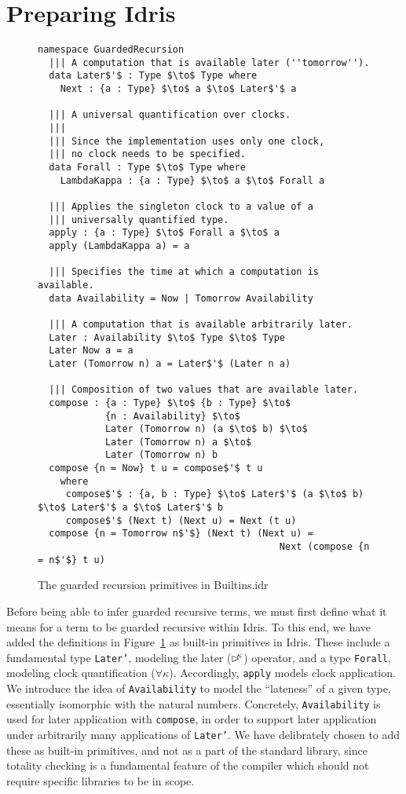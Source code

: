 \section{Preparing Idris}
\begin{figure}[h]
\begin{lstlisting}[mathescape,title=\idrisBlock]
namespace GuardedRecursion
  ||| A computation that is available later (''tomorrow'').
  data Later$'$ : Type $\to$ Type where
    Next : {a : Type} $\to$ a $\to$ Later$'$ a

  ||| A universal quantification over clocks.
  |||
  ||| Since the implementation uses only one clock,
  ||| no clock needs to be specified.
  data Forall : Type $\to$ Type where
    LambdaKappa : {a : Type} $\to$ a $\to$ Forall a
 
  ||| Applies the singleton clock to a value of a
  ||| universally quantified type.
  apply : {a : Type} $\to$ Forall a $\to$ a
  apply (LambdaKappa a) = a 

  ||| Specifies the time at which a computation is available.
  data Availability = Now | Tomorrow Availability

  ||| A computation that is available arbitrarily later.
  Later : Availability $\to$ Type $\to$ Type
  Later Now a = a
  Later (Tomorrow n) a = Later$'$ (Later n a)
  
  ||| Composition of two values that are available later.                             
  compose : {a : Type} $\to$ {b : Type} $\to$ 
            {n : Availability} $\to$ 
            Later (Tomorrow n) (a $\to$ b) $\to$ 
            Later (Tomorrow n) a $\to$ 
            Later (Tomorrow n) b
  compose {n = Now} t u = compose$'$ t u
    where
     compose$'$ : {a, b : Type} $\to$ Later$'$ (a $\to$ b) $\to$ Later$'$ a $\to$ Later$'$ b
     compose$'$ (Next t) (Next u) = Next (t u)
  compose {n = Tomorrow n$'$} (Next t) (Next u) = 
                                           Next (compose {n = n$'$} t u)
\end{lstlisting}
  \caption{The guarded recursion primitives in Builtins.idr}
  \label{fig:guarded_recursion_primitives}
\end{figure}

Before being able to infer guarded recursive terms, we must first define what it
means for a term to be guarded recursive within Idris. To this end, we have
added the definitions in Figure~\ref{fig:guarded_recursion_primitives} as
built-in primitives in Idris. These include a fundamental type \texttt{Later'},
modeling the later ($\rhd^{\!\!\kappa}$) operator, and a type \texttt{Forall},
modeling clock quantification ($\forall\kappa$). Accordingly, \texttt{apply}
models clock application. We introduce the idea of \texttt{Availability} to
model the ``lateness'' of a given type, essentially isomorphic with
the natural numbers. Concretely, \texttt{Availability} is used for later
application with \texttt{compose}, in order to support later application under
arbitrarily many applications of \texttt{Later'}. We have delibrately chosen to
add these as built-in primitives, and not as a part of the standard library,
since totality checking is a fundamental feature of the compiler which should
not require specific libraries to be in scope.

